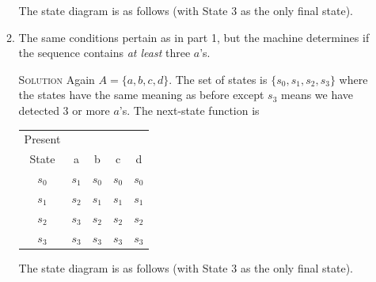 \documentclass[twoside]{amsart}
\newcommand{\solution}{\textsc{Solution}\xspace}
\begin{document}
\begin{enumerate}[A.]
\begin{enumerate}[1]
      The state diagram is as follows (with State 3 as the only final
      state).
      \begin{center}
      \end{center}

      \item The same conditions pertain as in part 1, but the machine
      determines if the sequence contains \emph{at least} three $a$'s.

      \noindent \solution Again $A=\{a,b,c,d\}$. The set of states is
      $\{s_0,s_1,s_2,s_3\}$ where the states have the same meaning
      as before except $s_3$ means we have detected 3 or more $a$'s.
      The next-state function is
      \vspace{5pt}
      \begin{center}
         \begin{tabular}{c|cccc}
	    Present & \\
	    State &   a   &   b   &   c   &   d   \\ \hline
	    $s_0$ & $s_1$ & $s_0$ & $s_0$ & $s_0$ \\
	    $s_1$ & $s_2$ & $s_1$ & $s_1$ & $s_1$ \\
	    $s_2$ & $s_3$ & $s_2$ & $s_2$ & $s_2$ \\
	    $s_3$ & $s_3$ & $s_3$ & $s_3$ & $s_3$ 
	 \end{tabular}
      \end{center}
      \vspace{5pt}
      The state diagram is as follows (with State 3 as the only final
      state).
      \begin{center}
      \end{center}


\end{enumerate}
\end{enumerate}
\end{document}
